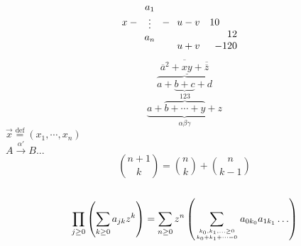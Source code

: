 \documentclass{article}
\begin{document}
	\[ x - \begin{array}{c}
		a_1 \\ \vdots \\ a_n \end{array}
	- \begin{array}[t]{cl}
		u - v & 10 \\
		u + v & \begin{array}[b]{r}
			12\\-120 \end{array}
		\end{array}		\]
	\[ \overline{\overline{a}^2 + \underline{xy} + \overline{\overline{z}}} \]
	\[ \overbrace{a + \underbrace{b + c} + d} \]
	\[ \underbrace{a + \overbrace{b + \cdots + y}^{123} + z}_{\alpha\beta\gamma} \]
	$\vec{x} \stackrel{\mathrm{def}}{=}(x_1,\cdots, x_n)$ \\
	$ A \stackrel{\alpha'}{\longrightarrow} B ... $\\
	\[ {n+1 \choose k} = {n \choose k} + {n \choose k-1} \]\\
	\[ \prod_{j\ge0}\left( \sum_{k\ge0} a_{jk}z^k \right) = 
		\sum_{n\ge0} z^n \left(\sum_{k_0, k_1, \ldots\ge0 \atop
		k_0 + k_1 +\cdots = 0} a_{0k_0} a_{1k_1}\ldots \right) \]\\
\end{document}
